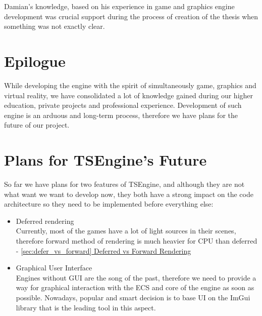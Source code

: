 Damian's knowledge, based on his experience in game and graphics engine development was crucial support during the process of creation of the thesis when something was not exactly clear.  

\section{Epilogue}
While developing the engine with the spirit of simultaneously game, graphics and virtual reality, we have consolidated a lot of knowledge gained during our higher education, private projects and professional experience. Development of such engine is an arduous and long-term process, therefore we have plans for the future of our project. 
\section{Plans for TSEngine's Future}
\label{sec:future}
So far we have plans for two features of TSEngine, and although they are not what want we want to develop now, they both have a strong impact on the code architecture so they need to be implemented before everything else: 
\begin{itemize}
    \item Deferred rendering\\
    Currently, most of the games have a lot of light sources in their scenes, therefore forward method of rendering is much heavier for CPU than deferred - \hyperref[sec:defer_vs_forward]{\ref*{sec:defer_vs_forward} Deferred vs Forward Rendering}
    \item Graphical User Interface\\
    Engines without GUI are the song of the past, therefore we need to  provide a way for graphical interaction with the ECS and core of the engine as soon as possible. Nowadays, popular and smart decision is to base UI on the ImGui library that is the leading tool in this aspect.  
\end{itemize}